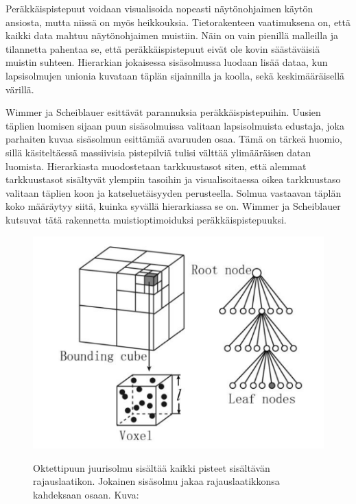 Peräkkäispistepuut voidaan visualisoida nopeasti näytönohjaimen käytön ansiosta, mutta niissä on myös heikkouksia. Tietorakenteen vaatimuksena on, että kaikki data mahtuu näytönohjaimen muistiin. Näin on vain pienillä malleilla ja tilannetta pahentaa se, että peräkkäispistepuut eivät ole kovin säästäväisiä muistin suhteen. Hierarkian jokaisessa sisäsolmussa luodaan lisää dataa, kun lapsisolmujen unionia kuvataan täplän sijainnilla ja koolla, sekä keskimääräisellä värillä.

Wimmer ja Scheiblauer esittävät parannuksia peräkkäispistepuihin. Uusien täplien luomisen sijaan puun sisäsolmuissa valitaan lapsisolmuista edustaja, joka parhaiten kuvaa sisäsolmun esittämää avaruuden osaa. Tämä on tärkeä huomio, sillä käsiteltäessä massiivisia pistepilviä tulisi välttää ylimääräisen datan luomista. Hierarkiasta muodostetaan tarkkuustasot siten, että alemmat tarkkuustasot sisältyvät ylempiin tasoihin ja visualisoitaessa oikea tarkkuustaso valitaan täplien koon ja katseluetäisyyden perusteella. Solmua vastaavan täplän koko määräytyy siitä, kuinka syvällä hierarkiassa se on. Wimmer ja Scheiblauer kutsuvat tätä rakennetta muistioptimoiduksi peräkkäispistepuuksi.  \cite{ip} %


\subtitle{Sisäkkäispistepuut}
\begin{figure}
    \centering
    \includegraphics[width=0.5\paperwidth]{img/octree.png}
    \label{octree}
    \caption{Oktettipuun juurisolmu sisältää kaikki pisteet sisältävän rajauslaatikon. Jokainen sisäsolmu jakaa rajauslaatikkonsa kahdeksaan osaan. Kuva: \cite{octreekuva}}
\end{figure}

